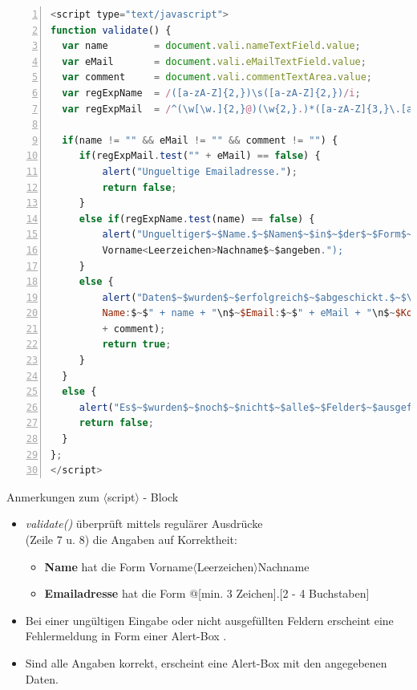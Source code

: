 \tiny{
\begin{lstlisting}[language = JavaScript,
				   mathescape = true, 
                   numbers = left, 
                   numbersep = 3pt]
<script type="text/javascript">
function validate() {
  var name        = document.vali.nameTextField.value;
  var eMail       = document.vali.eMailTextField.value;
  var comment     = document.vali.commentTextArea.value;
  var regExpName  = /([a-zA-Z]{2,})\s([a-zA-Z]{2,})/i;
  var regExpMail  = /^(\w[\w.]{2,}@)(\w{2,}.)*([a-zA-Z]{3,}\.[a-zA-Z]{2,4})/$\$$i;
	
  if(name != "" && eMail != "" && comment != "") {
	 if(regExpMail.test("" + eMail) == false) {
		 alert("Ungueltige Emailadresse.");
		 return false;
	 }
	 else if(regExpName.test(name) == false) {
		 alert("Ungueltiger$~$Name.$~$Namen$~$in$~$der$~$Form$~$\n$~$
		 Vorname<Leerzeichen>Nachname$~$angeben.");
	 }	
	 else { 
		 alert("Daten$~$wurden$~$erfolgreich$~$abgeschickt.$~$\n$~$Ihre$~$Daten:$~$\n$~$
		 Name:$~$" + name + "\n$~$Email:$~$" + eMail + "\n$~$Kommentar:$~$" 
		 + comment);	
		 return true;	
	 }
  }
  else {
	 alert("Es$~$wurden$~$noch$~$nicht$~$alle$~$Felder$~$ausgefuellt.");
	 return false;
  }
};
</script>
\end{lstlisting}}

\begin{frame}{Anmerkungen zum $\langle$script$\rangle$ - Block}
\small{
\begin{itemize}
\item {\it validate()} überprüft mittels regulärer Ausdrücke\\ (Zeile 7 u. 8) die Angaben auf Korrektheit:
	\begin{itemize}
	\item {\bf Name} hat die Form Vorname$\langle$Leerzeichen$\rangle$Nachname
	\item {\bf Emailadresse} hat die Form @[min. 3 Zeichen].[2 - 4 Buchstaben]
	\end{itemize}
\item Bei einer ungültigen Eingabe oder nicht ausgefüllten Feldern erscheint eine Fehlermeldung in Form einer Alert-Box .
\item Sind alle Angaben korrekt, erscheint eine Alert-Box mit den angegebenen Daten.
\end{itemize}}
\end{frame}
